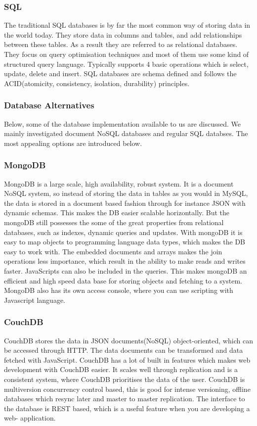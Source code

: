 \subsubsection*{SQL}
The traditional SQL databases is by far the most common way of storing data in the world today. They store data in columns and tables, and add relationships between these tables. As a result they are referred to as relational databases. They focus on query optimisation techniques and most of them use some kind of structured query language. Typically supports 4 basic operations which is select, update, delete and insert. SQL databases are schema defined and follows the ACID(atomicity, consistency, isolation, durability) principles.
\cite{ramakrishnan2003database}

\subsubsection{Database Alternatives}
Below, some of the database implementation available to us are discussed. We mainly investigated document NoSQL databases and regular SQL databses. The most appealing options are introduced below.

\subsubsection*{MongoDB}
MongoDB is a large scale, high availability, robust system. It is a document NoSQL system, so instead of storing the data in tables as you would in MySQL, the data is stored in a document based fashion through for instance JSON with dynamic schemas. This makes the DB easier scalable horizontally. But the mongoDB still possesses the some of the great properties from relational databases, such as indexes, dynamic queries and updates. With mongoDB it is easy to map objects to programming language data types, which makes the DB easy to work with. The embedded documents and arrays makes the join operations less importance, which result in the ability to make reads and writes faster. JavaScripts can also be included in the queries. This makes mongoDB an efficient and high speed data base for storing objects and fetching to a system. MongoDB also has its own access console, where you can use scripting with Javascript language. \cite{mongodb-intro}

\subsubsection*{CouchDB}
CouchDB stores the data in JSON documents(NoSQL) object-oriented, which can be accessed through HTTP. The data documents can be transformed and data fetched with JavaScript. CouchDB has a lot of built in features which makes web development with CouchDB easier. It scales well through replication and is a consistent system, where CouchDB prioritises the data of the user. CouchDB is multiversion concurrency control based, this is good for intense versioning, offline databases which resync later and master to master replication. The interface to the database is REST based, which is a useful feature when you are developing a web- application.
\cite{couchdb-about, couchdb-technical}

